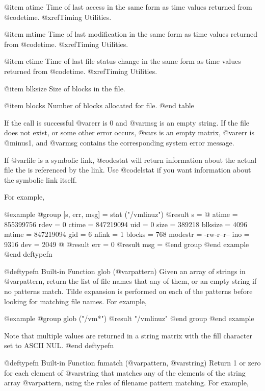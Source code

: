 {{@item atime
Time of last access in the same form as time values returned from
@code{time}.  @xref{Timing Utilities}.

@item mtime
Time of last modification in the same form as time values returned from
@code{time}.  @xref{Timing Utilities}.

@item ctime
Time of last file status change in the same form as time values returned from
@code{time}.  @xref{Timing Utilities}.

@item blksize
Size of blocks in the file.

@item blocks
Number of blocks allocated for file.
@end table

If the call is successful @var{err} is 0 and @var{msg} is an empty
string.  If the file does not exist, or some other error occurs, @var{s}
is an empty matrix, @var{err} is @minus{}1, and @var{msg} contains the
corresponding system error message.

If @var{file} is a symbolic link, @code{stat} will return information
about the actual file the is referenced by the link.  Use @code{lstat}
if you want information about the symbolic link itself.

For example,

@example
@group
[s, err, msg] = stat ("/vmlinuz")
     @result{} s =
        @{
          atime = 855399756
          rdev = 0
          ctime = 847219094
          uid = 0
          size = 389218
          blksize = 4096
          mtime = 847219094
          gid = 6
          nlink = 1
          blocks = 768
          modestr = -rw-r--r--
          ino = 9316
          dev = 2049
        @}
     @result{} err = 0
     @result{} msg = 
@end group
@end example
@end deftypefn

@deftypefn {Built-in Function} {} glob (@var{pattern})
Given an array of strings in @var{pattern}, return the list of file
names that any of them, or an empty string if no patterns match.  Tilde
expansion is performed on each of the patterns before looking for
matching file names.  For example,

@example
@group
glob ("/vm*")
     @result{} "/vmlinuz"
@end group
@end example

Note that multiple values are returned in a string matrix with the fill
character set to ASCII NUL.
@end deftypefn

@deftypefn {Built-in Function} {} fnmatch (@var{pattern}, @var{string})
Return 1 or zero for each element of @var{string} that matches any of
the elements of the string array @var{pattern}, using the rules of
filename pattern matching.  For example,

}}

